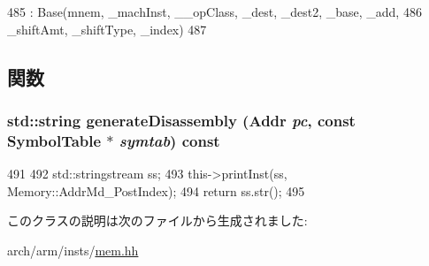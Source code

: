 \begin{DoxyCode}
485         : Base(mnem, _machInst, __opClass, _dest, _dest2, _base, _add,
486                 _shiftAmt, _shiftType, _index)
487     {}
\end{DoxyCode}


\subsection{関数}
\hypertarget{classArmISA_1_1MemoryPostIndex_a95d323a22a5f07e14d6b4c9385a91896}{
\subsubsection[{generateDisassembly}]{\setlength{\rightskip}{0pt plus 5cm}std::string generateDisassembly ({\bf Addr} {\em pc}, \/  const SymbolTable $\ast$ {\em symtab}) const}}
\label{classArmISA_1_1MemoryPostIndex_a95d323a22a5f07e14d6b4c9385a91896}



\begin{DoxyCode}
491     {
492         std::stringstream ss;
493         this->printInst(ss, Memory::AddrMd_PostIndex);
494         return ss.str();
495     }
\end{DoxyCode}


このクラスの説明は次のファイルから生成されました:\begin{DoxyCompactItemize}
\item 
arch/arm/insts/\hyperlink{arm_2insts_2mem_8hh}{mem.hh}\end{DoxyCompactItemize}
